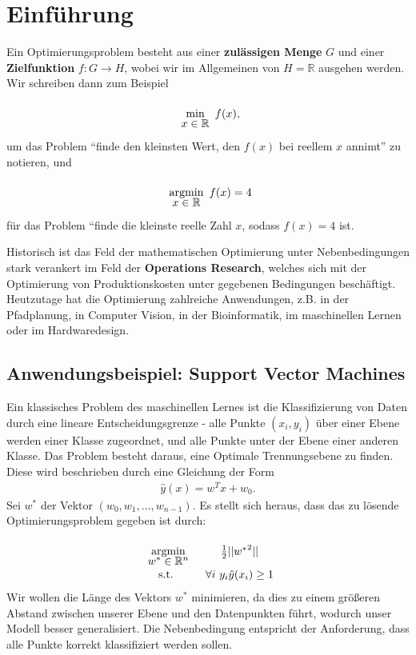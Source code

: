 \documentclass{report}
\newcommand{\tbf}{\textbf}
\newcommand{\argmin}[1] {
    \begin{array}{c}
        \vphantom{#1}\\[-3pt] %
        \text{argmin}\\[-3pt]
        #1\\
        \end{array}
    }
\renewcommand{\min}[1] {
    \begin{array}{c}
        \vphantom{#1}\\[-3pt] %
        \text{min}\\[-3pt]
        #1\\
        \end{array}
    }
\newcommand*{\newpar}{\par\vspace{\baselineskip}\noindent}
\begin{document}

\tableofcontents
\thispagestyle{fancy}
\chapter{Einführung}
Ein Optimierungsproblem besteht aus einer \tbf{zulässigen Menge} $G$ und einer \tbf{Zielfunktion} $f: G \to H$, wobei wir im Allgemeinen von $H = \mathbb{R}$ ausgehen werden. Wir schreiben dann zum Beispiel
\begin{align*}
 \min{x \in \mathbb{R}} f(x),
\end{align*}
um das Problem ``finde den kleinsten Wert, den $f(x)$ bei reellem $x$ annimt'' zu notieren, und
\begin{align*}
 \argmin{x \in \mathbb{R}} f(x) = 4
\end{align*}
für das Problem ``finde die kleinste reelle Zahl $x$, sodass $f(x) = 4$ ist.
\newpar
Historisch ist das Feld der mathematischen Optimierung unter Nebenbedingungen stark verankert im Feld der \tbf{Operations Research}, welches sich mit der Optimierung von Produktionskosten unter gegebenen Bedingungen beschäftigt. Heutzutage hat die Optimierung zahlreiche Anwendungen, z.B. in der Pfadplanung, in Computer Vision, in der Bioinformatik, im maschinellen Lernen oder im Hardwaredesign.
\section{Anwendungsbeispiel: Support Vector Machines}
Ein klassisches Problem des maschinellen Lernes ist die Klassifizierung von Daten durch eine lineare Entscheidungsgrenze - alle Punkte $(x_i,y_i)$ über einer Ebene werden einer Klasse zugeordnet, und alle Punkte unter der Ebene einer anderen Klasse. Das Problem besteht daraus, eine Optimale Trennungsebene zu finden. Diese wird beschrieben durch eine Gleichung der Form
\begin{align*}
 \hat{y}(x) = w^T x + w_0.
\end{align*}
Sei $w^*$ der Vektor $(w_0, w_1, \hdots, w_{n-1})$.
Es stellt sich heraus, dass das zu lösende Optimierungsproblem gegeben ist durch:
\begin{align*}
\begin{array}{cc}
\argmin{w^{*} \in \mathbb{R}^n} &\frac{1}{2} ||{w^{*}}^2||\\
 \text{s.t. } &\forall i\ y_i\hat{y}(x_i) \geq 1
\end{array}
\end{align*}
Wir wollen die Länge des Vektors $w^*$ minimieren, da dies zu einem größeren Abstand zwischen unserer Ebene und den Datenpunkten führt, wodurch unser Modell besser generalisiert. Die Nebenbedingung entspricht der Anforderung, dass alle Punkte korrekt klassifiziert werden sollen.
\end{document}
